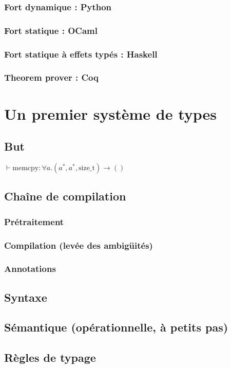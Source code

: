 \documentclass{phdthesis}
\begin{document}
\subsection{Fort dynamique : Python}
\subsection{Fort statique : OCaml}
\subsection{Fort statique à effets typés : Haskell}
\subsection{Theorem prover : Coq}

\chapter{Un premier système de types}

\section{But}

$⊢ \text{memcpy} : ∀ a . (a^*, a^*, \text{size\_t}) → ()$

\section{Chaîne de compilation}
\subsection{Prétraitement}
\subsection{Compilation (levée des ambigüités)}
\subsection{Annotations}
\section{Syntaxe}
\section{Sémantique (opérationnelle, à petits pas)}
\section{Règles de typage}
\end{document}
